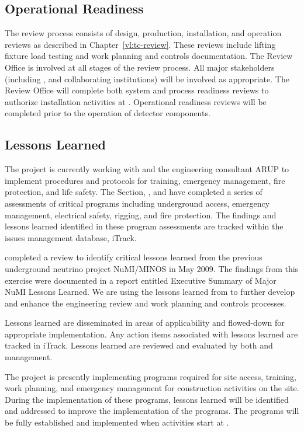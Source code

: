 \subsection{Operational Readiness}

The  review process consists of design, production,
installation, and operation reviews as described in
Chapter~\ref{vl:tc-review}. These reviews include lifting fixture
load testing and work planning and controls documentation. The
 Review Office is involved at all stages of the review
process. All major stakeholders (including ,  and
 collaborating institutions) will be involved as
appropriate. The Review Office will complete both system and process
readiness reviews to authorize installation activities at
.  Operational readiness reviews will be completed prior
 to the operation of detector components.

\subsection{Lessons Learned}

The  project is currently working with  and the 
engineering consultant ARUP to implement  procedures and
protocols for training, emergency management, fire
protection, and life safety. The \fnal {} Section, , and
  have completed a series of assessments of
critical   programs including underground access,
emergency management, electrical safety, rigging, and fire
protection. The findings and lessons learned identified in these
 program assessments are tracked within the \fnal issues management
database, iTrack.

 completed a review to
identify critical lessons learned from the previous underground
neutrino project NuMI/MINOS  in May 2009. The findings from this
exercise were documented in a report entitled Executive Summary of
Major NuMI Lessons Learned.  We are using the  lessons learned from
to further develop and enhance
the  engineering review and work planning and controls
processes.

Lessons learned are disseminated in areas of applicability and
flowed-down for appropriate implementation. Any action items
associated with lessons learned are tracked in iTrack. Lessons learned
are reviewed and evaluated by both  and  management.

The  project is presently implementing 
programs required for site access, training, work planning, and
emergency management for construction activities on the 
site. During the implementation of these programs,  lessons learned will
be identified and addressed to improve the implementation of the 
 programs.  The  programs will be fully
established and implemented when  activities start at
.
